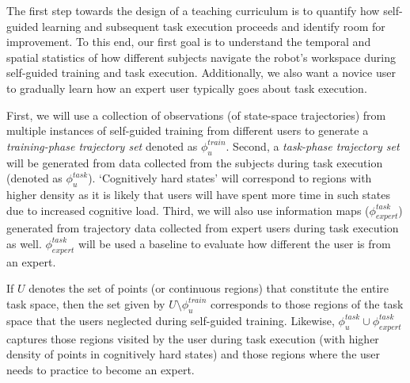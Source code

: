 \documentclass[12pt]{article}
\begin{document}
The first step towards the design of a teaching curriculum is to quantify how self-guided learning and subsequent task execution proceeds and identify room for improvement. To this end, our first goal is to understand the temporal and spatial statistics of how different subjects navigate the robot's workspace during self-guided training and task execution. Additionally, we also want a novice user to gradually learn how an expert user typically goes about task execution.


First, we will use a collection of observations (of state-space trajectories) from multiple instances of self-guided training from different users to generate a \textit{training-phase trajectory set} denoted as $\phi_{u}^{train}$. 
Second, a \textit{task-phase trajectory set} will be generated from data collected from the subjects during task execution (denoted as $\phi_{u}^{task}$). `Cognitively hard states' will correspond to regions with higher density as it is likely that users will have spent more time in such states due to increased cognitive load.
Third, we will also use information maps ($\phi_{expert}^{task}$) generated from trajectory data collected from expert users during task execution as well. $\phi_{expert}^{task}$ will be used a baseline to evaluate how different the user is from an expert.

If $U$ denotes the set of points (or continuous regions) that constitute the entire task space, then the set given by $U \setminus \phi_{u}^{train}$ corresponds to those regions of the task space that the users neglected during self-guided training.
Likewise,  $\phi_{u}^{task} \cup \phi_{expert}^{task}$ captures those regions visited by the user during task execution (with higher density of points in cognitively hard states) and those regions where the user needs to practice to become an expert. 
\end{document}
